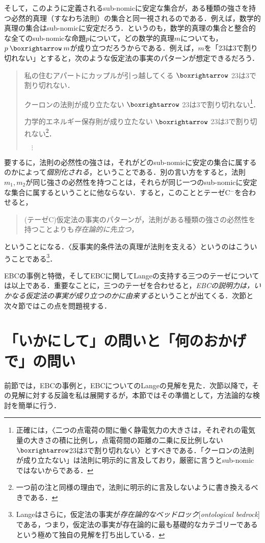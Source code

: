 \documentclass[dvipdfmx,twoside,11pt,uplatex]{jsarticle}
\newcommand{\myterm}[2]{{\emph{#1}}{[\emph{#2}]}}
\theoremstyle{definition}
\begin{document}
そして，このように定義されるsub-nomicに安定な集合が，ある種類の強さを持つ必然的真理（すなわち法則）の集合と同一視されるのである．例えば，数学的真理の集合はsub-nomicに安定だろう．というのも，数学的真理の集合と整合的な全てのsub-nomicな命題$p$について，どの数学的真理$m$についても，$p\necif m$が成り立つだろうからである．例えば，$m$を「23は3で割り切れない」とすると，次のような仮定法の事実のパターンが想定できるだろう．
\begin{quote}
    私の住むアパートにカップルが引っ越してくる $\necif$ 23は3で割り切れない．

    クーロンの法則が成り立たない $\necif$ 23は3で割り切れない\footnote{
    正確には，〈二つの点電荷の間に働く静電気力の大きさは，それぞれの電気量の大きさの積に比例し，点電荷間の距離の二乗に反比例しない$\necif$23は3で割り切れない〉とすべきである．「クーロンの法則が成り立たない」は法則に明示的に言及しており，厳密に言うとsub-nomicではないからである．
    }．

    力学的エネルギー保存則が成り立たない $\necif$ 23は3で割り切れない\footnote{
    一つ前の注と同様の理由で，法則に明示的に言及しないように書き換えるべきである．
    }．

    $\quad\vdots$
\end{quote}
要するに，法則の必然性の強さは，それがどのsub-nomicに安定の集合に属するのかによって\emph{個別化される}，ということである．別の言い方をすると，法則$m_1, m_2$が同じ強さの必然性を持つことは，それらが同じ一つのsub-nomicに安定な集合に属するということに他ならない．すると，このこととテーゼC$^{-}$を合わせると，
\begin{quote}
    (テーゼC)\quad 仮定法の事実のパターンが，法則がある種類の強さの必然性を持つことよりも\emph{存在論的に先立つ}，
\end{quote}
ということになる．〈反事実的条件法の真理が法則を支える〉というのはこういうことである\footnote{
Langeはさらに，仮定法の事実が\myterm{存在論的なベッドロック}{ontological bedrock}である，つまり，仮定法の事実が存在論的に最も基礎的なカテゴリーであるという極めて独自の見解を打ち出している\citep[137]{lange2009lawmakers}．
}．

EBCの事例と特徴，そしてEBCに関してLangeの支持する三つのテーゼについては以上である．重要なことに，三つのテーゼを合わせると，\emph{EBCの説明力は，いかなる仮定法の事実が成り立つのかに由来する}ということが出てくる．次節と次々節ではこの点を問題視する．

\section{「いかにして」の問いと「何のおかげで」の問い}\label{howandwhat}
前節では，EBCの事例と，EBCについてのLangeの見解を見た．次節以降で，その見解に対する反論を私は展開するが，本節ではその準備として，方法論的な検討を簡単に行う．
\end{document}

